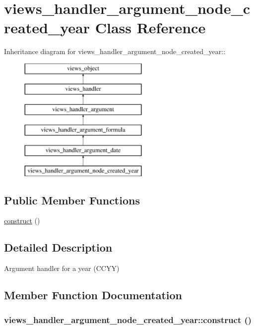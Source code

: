 \hypertarget{classviews__handler__argument__node__created__year}{
\section{views\_\-handler\_\-argument\_\-node\_\-created\_\-year Class Reference}
\label{classviews__handler__argument__node__created__year}
}
Inheritance diagram for views\_\-handler\_\-argument\_\-node\_\-created\_\-year::\begin{figure}[H]
\begin{center}
\leavevmode
\includegraphics[height=6cm]{classviews__handler__argument__node__created__year}
\end{center}
\end{figure}
\subsection*{Public Member Functions}
\begin{CompactItemize}
\item 
\hyperlink{classviews__handler__argument__node__created__year_a40b34ab0d297264f7378fc995e06bc7}{construct} ()
\end{CompactItemize}


\subsection{Detailed Description}
Argument handler for a year (CCYY) 

\subsection{Member Function Documentation}
\hypertarget{classviews__handler__argument__node__created__year_a40b34ab0d297264f7378fc995e06bc7}{
\subsubsection[{construct}]{\setlength{\rightskip}{0pt plus 5cm}views\_\-handler\_\-argument\_\-node\_\-created\_\-year::construct ()}}
\label{classviews__handler__argument__node__created__year_a40b34ab0d297264f7378fc995e06bc7}


